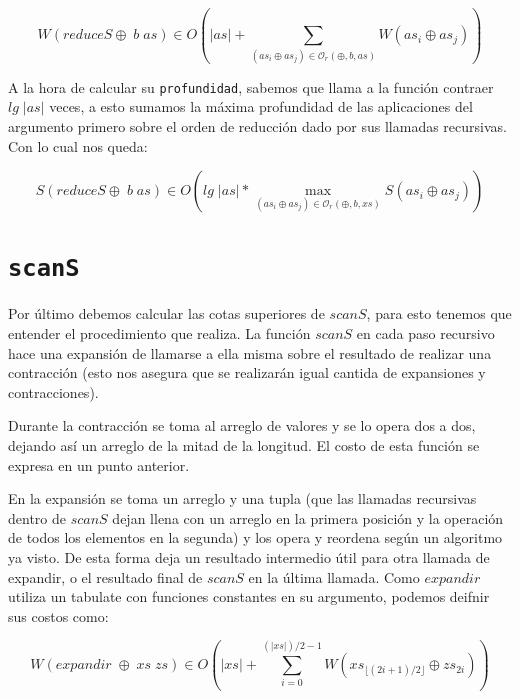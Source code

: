 \documentclass[a4paper,10pt]{article}
\begin{document}
\begin{equation*}
    W \left( reduceS \oplus \; b \; as \right) \in
    O \left( \vert as \vert + \sum_{(as_i \oplus as_j) \in \mathcal{O}_r(\oplus,b,as)} W \left( as_i \oplus as_j \right) \right)
\end{equation*}

\bigskip
    A la hora de calcular su \texttt{profundidad}, sabemos que llama a la función
contraer $lg \;\vert as \vert$ veces, a esto sumamos la máxima profundidad de las 
aplicaciones del argumento primero sobre el orden de reducción dado por sus 
llamadas recursivas. Con lo cual nos queda:

\begin{equation*}
    S \left( reduceS \oplus \; b \; as \right) \in
    O \left( lg \; \vert as \vert * \max_{(as_i \oplus as_j) \in \mathcal{O}_r(\oplus,b,xs)} S \left( as_i \oplus as_j \right) \right)
\end{equation*}


\bigskip


\section*{\texttt{scanS}}

    Por último debemos calcular las cotas superiores de $scanS$, para
esto tenemos que entender el procedimiento que realiza. La función $scanS$ en
cada paso recursivo hace una expansión de llamarse a ella misma 
sobre el resultado de realizar una contracción (esto nos asegura que se 
realizarán igual cantida de expansiones y contracciones).

\bigskip

    Durante la contracción se toma al arreglo de valores y se lo opera
dos a dos, dejando así un arreglo de la mitad de la longitud. El costo
de esta función se expresa en un punto anterior.

\bigskip

    En la expansión se toma un arreglo y una tupla (que las llamadas recursivas 
dentro de $scanS$ dejan llena con un arreglo en la primera posición y la 
operación de todos los elementos en la segunda) y los opera y reordena según un
algoritmo ya visto. De esta forma deja un resultado intermedio útil para otra
llamada de expandir, o el resultado final de $scanS$ en la última llamada. Como
$expandir$ utiliza un tabulate con funciones constantes en su argumento, podemos
deifnir sus costos como:

\begin{equation*}
    W \left( expandir \;\oplus \;xs \;zs \right) \in
    O \left( \vert xs \vert + \sum_{i=0}^{(\vert xs \vert)/2 - 1} W \left( xs_{\lfloor (2i+1)/2 \rfloor} \oplus zs_{2i} \right) \right)
\end{equation*}
\end{document}
